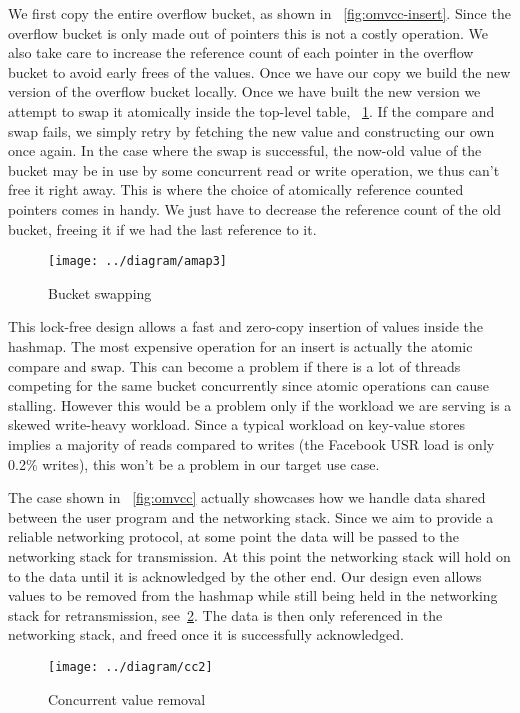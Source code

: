 \documentclass[11pt]{article}
\begin{document}
We first copy the entire overflow bucket, as shown in
~\ref{fig:omvcc-insert}. Since the overflow bucket is only made out of
pointers this is not a costly operation. We also take care to increase
the reference count of each pointer in the overflow bucket to avoid
early frees of the values. Once we have our copy we build the new
version of the overflow bucket locally. Once we have built the new
version we attempt to swap it atomically inside the top-level
table, ~\ref{fig:omvcc-swap}. If the compare and swap fails, we simply
retry by fetching the new value and constructing our own once
again. In the case where the swap is successful, the now-old value of
the bucket may be in use by some concurrent read or write operation,
we thus can't free it right away. This is where the choice of
atomically reference counted pointers comes in handy. We just have to
decrease the reference count of the old bucket, freeing it if we had
the last reference to it.

\begin{figure}
  \texttt{[image: ../diagram/amap3]}
  \caption{Bucket swapping}
  \label{fig:omvcc-swap}
\end{figure}

This lock-free design allows a fast and zero-copy insertion of values
inside the hashmap. The most expensive operation for an insert is
actually the atomic compare and swap. This can become a problem if
there is a lot of threads competing for the same bucket concurrently
since atomic operations can cause stalling. However this would be a
problem only if the workload we are serving is a skewed write-heavy
workload. Since a typical workload on key-value stores implies a
majority of reads compared to writes (the Facebook USR load is only
0.2\% writes), this won't be a problem in our target use case.

The case shown in ~\ref{fig:omvcc} actually showcases how we handle
data shared between the user program and the networking stack. Since
we aim to provide a reliable networking protocol, at some point the
data will be passed to the networking stack for transmission. At this
point the networking stack will hold on to the data until it is
acknowledged by the other end. Our design even allows values to be
removed from the hashmap while still being held in the networking
stack for retransmission, see~\ref{fig:cc2}. The data is then only
referenced in the networking stack, and freed once it is successfully
acknowledged.

\begin{figure}[htb!]
  \texttt{[image: ../diagram/cc2]}
  \caption{Concurrent value removal}
  \label{fig:cc2}
\end{figure}
\end{document}
